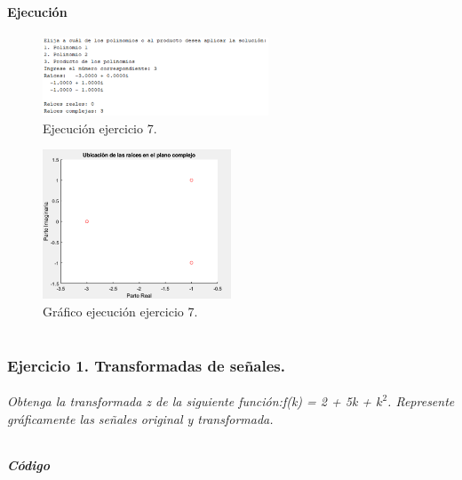 \documentclass[a4paper, 12pt]{article}
\begin{document}
	\subsection{Ejecución}
	\begin{figure}[ht]
		\centering
		\includegraphics[width=0.6\textwidth]{figures/ejc7.png}
		\caption{Ejecución ejercicio 7.}
		\label{ejec7}
	\end{figure}
	\begin{figure}[ht]
		\centering
		\includegraphics[width=0.5\textwidth]{figures/graf7.png}
		\caption{Gráfico ejecución ejercicio 7.}
		\label{grafica7}
	\end{figure}

    \part{}
    
    \section{Ejercicio 1. Transformadas de señales.}
    \subsection{}
	\paragraph{Obtenga la transformada z de la siguiente función:f(k) = 2 + 5k + $k^{2}$. Represente gráficamente las señales original y transformada.}
    \subsubsection*{Código}
	\inputminted[fontsize=\scriptsize, linenos, breaklines=true, xleftmargin=0.75cm, frame=lines]{matlab}{code/parte2/Ej1p1.m}
\end{document}
